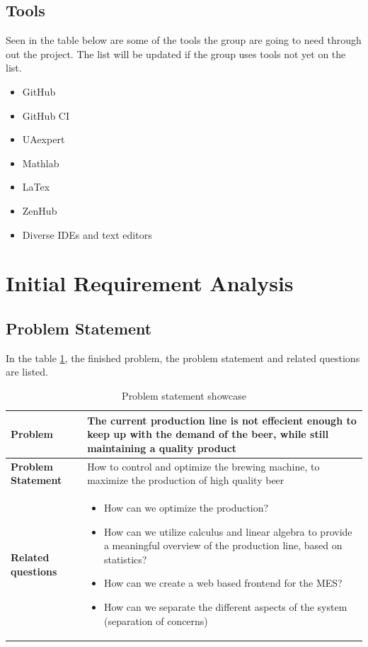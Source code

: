 \subsection{Tools}
Seen in the table below are some of the tools the group are going to need
through out the project. The list will be updated if the group uses tools not
yet on the list.

\begin{itemize}
    \item GitHub
    \item GitHub CI
    \item UAexpert
    \item Mathlab
    \item LaTex
    \item ZenHub
    \item Diverse IDEs and text editors
\end{itemize}

\section{Initial Requirement Analysis}

\subsection{Problem Statement}
In the table \ref{table:problem-statement}, the finished problem, the problem statement and related questions are listed.
\begin{table}[ht]
    \begin{tabularx}{\textwidth}{|>{\RaggedRight}p{4cm}|>{\RaggedRight}X|}
        \hline
        \textbf{Problem} & The current production line is not effecient enough to keep up with the demand of the beer, while still maintaining a quality product\\
        \hline
        \textbf{Problem Statement} & How to control and optimize the brewing machine, to maximize the production of high quality beer\\
        \hline
        \textbf{Related questions} & 
            \begin{itemize}
                \item How can we optimize the production?
                \item How can we utilize calculus and linear algebra to provide a meaningful overview of the production line, based on statistics?
                \item How can we create a web based frontend for the MES?
                \item How can we separate the different aspects of the system (separation of concerns)
            \end{itemize}
        \\ 
        \hline
    \end{tabularx}
    \caption{Problem statement showcase} 
    \label{table:problem-statement}
\end{table} 

